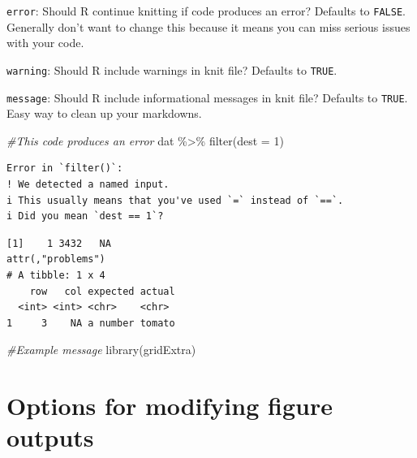 \documentclass[
  letterpaper,
  DIV=11,
  numbers=noendperiod]{scrreprt}
\newenvironment{Shaded}{\begin{snugshade}}{\end{snugshade}}
\newcommand{\AttributeTok}[1]{\textcolor[rgb]{0.49,0.56,0.16}{#1}}
\newcommand{\CommentTok}[1]{\textcolor[rgb]{0.38,0.63,0.69}{\textit{#1}}}
\newcommand{\DecValTok}[1]{\textcolor[rgb]{0.25,0.63,0.44}{#1}}
\newcommand{\FunctionTok}[1]{\textcolor[rgb]{0.02,0.16,0.49}{#1}}
\newcommand{\NormalTok}[1]{\textcolor[rgb]{0.00,0.44,0.13}{#1}}
\newcommand{\SpecialCharTok}[1]{\textcolor[rgb]{0.25,0.44,0.63}{#1}}
\newcommand{\StringTok}[1]{\textcolor[rgb]{0.25,0.44,0.63}{#1}}
\begin{document}
\texttt{error}: Should R continue knitting if code produces an error?
Defaults to \texttt{FALSE}. Generally don't want to change this because
it means you can miss serious issues with your code.

\texttt{warning}: Should R include warnings in knit file? Defaults to
\texttt{TRUE}.

\texttt{message}: Should R include informational messages in knit file?
Defaults to \texttt{TRUE}. Easy way to clean up your markdowns.

\begin{Shaded}
\begin{Highlighting}[]
\CommentTok{\#This code produces an error}
\NormalTok{dat }\SpecialCharTok{\%\textgreater{}\%}
  \FunctionTok{filter}\NormalTok{(}\AttributeTok{dest =} \DecValTok{1}\NormalTok{)}
\end{Highlighting}
\end{Shaded}

\begin{verbatim}
Error in `filter()`:
! We detected a named input.
i This usually means that you've used `=` instead of `==`.
i Did you mean `dest == 1`?
\end{verbatim}

\begin{Shaded}
\end{Shaded}

\begin{verbatim}
[1]    1 3432   NA
attr(,"problems")
# A tibble: 1 x 4
    row   col expected actual
  <int> <int> <chr>    <chr> 
1     3    NA a number tomato
\end{verbatim}

\begin{Shaded}
\begin{Highlighting}[]
\CommentTok{\#Example message}
\FunctionTok{library}\NormalTok{(gridExtra)}
\end{Highlighting}
\end{Shaded}

\hypertarget{options-for-modifying-figure-outputs}{%
\section{Options for modifying figure
outputs}\label{options-for-modifying-figure-outputs}}
\end{document}
